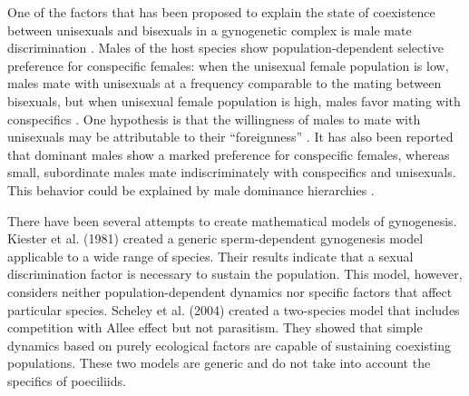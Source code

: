 	One of the factors that has been proposed to explain the state of coexistence between unisexuals and bisexuals in a gynogenetic complex is male mate discrimination \cite{Kokko:persist, Balsano:Poecilia, Kiester:Gynogenetic, Heubel:extinct}. Males of the host species show population-dependent selective preference for conspecific females: when the unisexual female population is low, males mate with unisexuals at a frequency comparable to the mating between bisexuals, but when unisexual female population is high, males favor mating with conspecifics \cite{Riesch:limitation}. One hypothesis is that the willingness of males to mate with unisexuals may be attributable to their ``foreignness'' \cite{Balsano:Poecilia}. It has also been reported that dominant males show a marked preference for conspecific females, whereas small, subordinate males mate indiscriminately with conspecifics and unisexuals. This behavior could be explained by male dominance hierarchies \cite{Balsano:Poecilia}. 

	There have been several attempts to create mathematical models of gynogenesis. Kiester et al. (1981) \cite{Kiester:Gynogenetic} created a generic sperm-dependent gynogenesis model applicable to a wide range of species. Their results indicate that a sexual discrimination factor is necessary to sustain the population. This model, however, considers neither population-dependent dynamics nor specific factors that affect particular species. Scheley et al. (2004) \cite{Schley:parthenogenesis} created a two-species model that includes competition with Allee effect but not parasitism. They showed that simple dynamics based on purely ecological factors are capable of sustaining coexisting populations. These two models are generic and do not take into account the specifics of poeciliids. 
	
